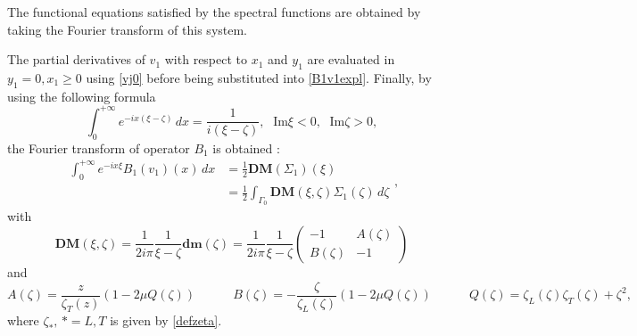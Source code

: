 The functional equations satisfied by the spectral functions are obtained by taking the Fourier transform of this system. 

The partial derivatives of $v_1$ with respect to $x_1$ and $y_1$ are evaluated in  $y_1=0, x_1 \geq 0$ using \eqref{vj0} before being substituted into \eqref{B1v1expl}. Finally, by using the following formula
$$\int_0^{+\infty} e^{-ix(\xi-\zeta)}\,dx=\frac{1}{i(\xi-\zeta)}, \; \mbox{ Im}\xi <0, \;  \mbox{ Im} \zeta>0, $$
the Fourier transform of operator $B_1$ is obtained :
\begin{equation}
\begin{split}
\int_0^{+\infty} e^{-ix\xi}B_1(v_1)(x)\,dx&=\frac{1}{2}\textbf{DM}(\Sigma_1)(\xi) \\
&=\frac{1}{2} \int_{\Gamma_0}\textbf{DM}(\xi,\zeta)\Sigma_1(\zeta)\,d\zeta
\end{split},
\label{B1DM}
\end{equation}
with
\begin{equation}
\textbf{DM}(\xi,\zeta)=\frac{1}{2i\pi} \frac{1}{\xi-\zeta} \textbf{dm}(\zeta) =\frac{1}{2i\pi} \frac{1}{\xi-\zeta} \begin{pmatrix}
-1 & A(\zeta) \\
B(\zeta) & -1
\end{pmatrix}
\label{defDM}
\end{equation}
and
\begin{equation}
A(\zeta)=\frac{z}{\zeta_T(z)}(1-2\mu Q(\zeta)) \hspace{3em} B(\zeta)=-\frac{\zeta}{\zeta_L(\zeta)}(1-2\mu Q(\zeta)) \hspace{3em}
Q(\zeta)=\zeta_L(\zeta) \zeta_T(\zeta)+\zeta^2,
\end{equation}
where $\zeta_*,\, *=L,T$ is given by \eqref{defzeta}.


